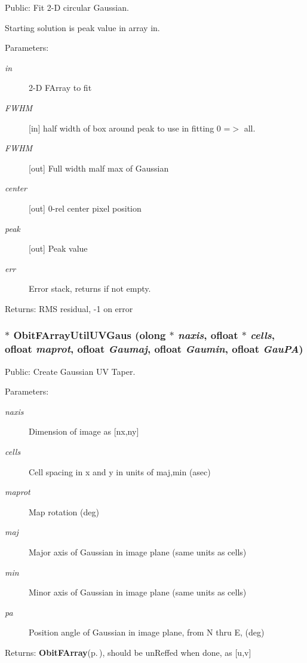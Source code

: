 Public: Fit 2-D circular Gaussian. 

Starting solution is peak value in array in. \begin{Desc}
\item[Parameters:]
\begin{description}
\item[{\em in}]2-D FArray to fit \item[{\em FWHM}][in] half width of box around peak to use in fitting 0 =$>$ all. \item[{\em FWHM}][out] Full width malf max of Gaussian \item[{\em center}][out] 0-rel center pixel position \item[{\em peak}][out] Peak value \item[{\em err}]Error stack, returns if not empty. \end{description}
\end{Desc}
\begin{Desc}
\item[Returns:]RMS residual, -1 on error \end{Desc}
\subsubsection{$\ast$ Obit\-FArray\-Util\-UVGaus ({\bf olong} $\ast$ {\em naxis}, {\bf ofloat} $\ast$ {\em cells}, {\bf ofloat} {\em maprot}, {\bf ofloat} {\em Gaumaj}, {\bf ofloat} {\em Gaumin}, {\bf ofloat} {\em Gau\-PA})}\label{ObitFArrayUtil_8c_a3}


Public: Create Gaussian UV Taper. 

\begin{Desc}
\item[Parameters:]
\begin{description}
\item[{\em naxis}]Dimension of image as [nx,ny] \item[{\em cells}]Cell spacing in x and y in units of maj,min (asec) \item[{\em maprot}]Map rotation (deg) \item[{\em maj}]Major axis of Gaussian in image plane (same units as cells) \item[{\em min}]Minor axis of Gaussian in image plane (same units as cells) \item[{\em pa}]Position angle of Gaussian in image plane, from N thru E, (deg) \end{description}
\end{Desc}
\begin{Desc}
\item[Returns:]{\bf Obit\-FArray}{\rm (p.\,\pageref{structObitFArray})}, should be un\-Reffed when done, as [u,v] \end{Desc}
